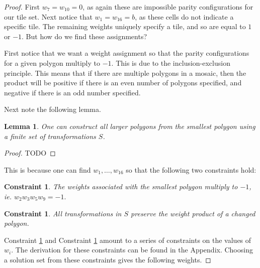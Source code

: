 \documentclass[12pt]{article}
\theoremstyle{plain}
\newtheorem{lemma}[thm]{Lemma}
\newtheorem{constraint}[thm]{Constraint}
\theoremstyle{definition}
\theoremstyle{remark}
\theoremstyle{definition}
\begin{document}
\begin{proof}
First $w_{7}=w_{10}=0$, as again these are impossible parity configurations for our tile set. Next notice that $w_{1} = w_{16} = b$, as these cells do not indicate a specific tile.  The remaining weights uniquely specify a tile, and so are equal to $1$ or $-1$. But how do we find these assignments?

First notice that we want a weight assignment so that the parity configurations for a given polygon multiply to $-1$. This is due to the inclusion-exclusion principle. This means that if there are multiple polygons in a mosaic, then the product will be positive if there is an even number of polygons specified, and negative if there is an odd number specified.

Next note the following lemma.
\begin{lemma}
    \label{lemma: build bigger saps}
    One can construct all larger polygons from the smallest polygon using a finite set of transformations $S$.
\end{lemma}

\begin{proof}
    TODO
\end{proof}

This is because one can find $w_{1} , \dots, w_{16}$ so that the following two constraints hold:

\begin{constraint}
    \label{constraint: smallest sap prod}
    The weights associated with the smallest polygon multiply to $-1$, ie. $w_2 w_3 w_5 w_9 = -1.$ 
\end{constraint}

\begin{constraint}
    \label{constraint: prod works}
    \emph{All} transformations in $S$ preserve the weight product of a changed polygon.
\end{constraint}

Constraint \ref{constraint: smallest sap prod} and Constraint \ref{constraint: prod works} amount to a series of constraints on the values of $w_i$. The derivation for these constraints can be found in the Appendix. Choosing a solution set from these constraints gives the following weights.


\end{proof}
\end{document}
